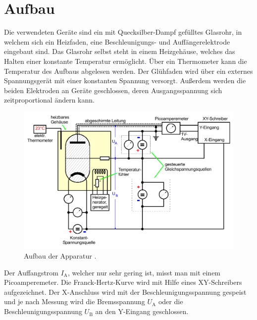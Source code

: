 \section{Aufbau}
\label{sec:Aufbau}

Die verwendeten Geräte sind ein mit Quecksilber-Dampf gefülltes Glasrohr, in welchem sich ein Heizfaden, eine Beschleunigungs- und Auffängerelektrode eingebaut sind.
Das Glasrohr selbst steht in einem Heizgehäuse, welches das Halten einer konstante Temperatur ermöglicht. Über ein Thermometer kann die Temperatur des Aufbaus abgelesen werden.
Der Glühfaden wird über ein externes Spannungsgerät mit einer konstanten Spannung versorgt. Außerdem werden die beiden Elektroden an Geräte geschlossen, deren 
Ausgangsspannung sich zeitproportional ändern kann.
\begin{figure}
    \centering
    \includegraphics[width = 12cm]{Aufbau.pdf}
    \caption{Aufbau der Apparatur \cite{ap601}.}
    \label{fig:AufbauMessung}
\end{figure}

Der Auffangstrom $I_{\text{A}}$, welcher nur sehr gering ist, misst man mit einem Picoamperemeter.
Die Franck-Hertz-Kurve wird mit Hilfe eines XY-Schreibers aufgezeichnet. Der X-Anschluss wird mit der Beschleunigungsspannung 
gespeist und je nach Messung wird die Bremsspannung $U_{\text{A}}$ oder die Beschleunigungsspannung $U_{\text{B}}$ an den Y-Eingang geschlossen.